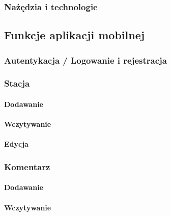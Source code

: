 \subsubsection{Nażędzia i technologie}
\subsection{Funkcje aplikacji mobilnej}
\subsubsection{Autentykacja / Logowanie i rejestracja}
\subsubsection{Stacja}
\paragraph{Dodawanie}
\paragraph{Wczytywanie}
\paragraph{Edycja}
\subsubsection{Komentarz}
\paragraph{Dodawanie}
\paragraph{Wczytywanie}
